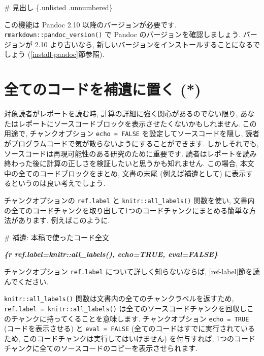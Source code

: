 \documentclass[
  11pt,
]{bxjsreport}
\newenvironment{Shaded}{\begin{snugshade}}{\end{snugshade}}
\newcommand{\FunctionTok}[1]{\textcolor[rgb]{0.00,0.00,0.00}{#1}}
\newcommand{\InformationTok}[1]{\textcolor[rgb]{0.56,0.35,0.01}{\textbf{\textit{#1}}}}
\begin{document}
\begin{Shaded}
\begin{Highlighting}[]
\FunctionTok{\# 見出し \{.unlisted .unnumbered\}}
\end{Highlighting}
\end{Shaded}

この機能は Pandoc 2.10 以降のバージョンが必要です. \texttt{rmarkdown::pandoc\_version()} で Pandoc のバージョンを確認しましょう. バージョンが 2.10 より古いなら, 新しいバージョンをインストールすることになるでしょう (\ref{install-pandoc}節参照).

\hypertarget{code-appendix}{%
\section{全てのコードを補遺に置く (*)}\label{code-appendix}}

対象読者がレポートを読む時, 計算の詳細に強く関心があるのでない限り, あなたはレポートにソースコードブロックを表示させたくないかもしれません. この用途で, チャンクオプション \texttt{echo = FALSE} を設定してソースコードを隠し, 読者がプログラムコードで気が散らないようにすることができます. しかしそれでも, ソースコードは再現可能性のある研究のために重要です. 読者はレポートを読み終わった後に計算の正しさを検証したいと思うかも知れません. この場合, 本文中の全てのコードブロックをまとめ, 文書の末尾 (例えば補遺として) に表示するというのは良い考えでしょう.

チャンクオプションの \texttt{ref.label} と \texttt{knitr::all\_labels()} 関数を使い, 文書内の全てのコードチャンクを取り出して1つのコードチャンクにまとめる簡単な方法があります. 例えばこのように.

\begin{Shaded}
\begin{Highlighting}[]
\FunctionTok{\# 補遺: 本稿で使ったコード全文}

\InformationTok{\textasciigrave{}\textasciigrave{}\textasciigrave{}\{r ref.label=knitr::all\_labels(), echo=TRUE, eval=FALSE\}}
\InformationTok{\textasciigrave{}\textasciigrave{}\textasciigrave{}}
\end{Highlighting}
\end{Shaded}

チャンクオプション \texttt{ref.label} について詳しく知らないならば, \ref{ref-label}節を読んでください.

\texttt{knitr::all\_labels()} 関数は文書内の全てのチャンクラベルを返すため, \texttt{ref.label = knitr::all\_labels()} は全てのソースコードチャンクを回収しこのチャンクに持ってくることを意味します. チャンクオプション \texttt{echo = TRUE} (コードを表示させる) と \texttt{eval = FALSE} (全てのコードはすでに実行されているため, このコードチャンクは実行してはいけません) を付与すれば, 1つのコードチャンクに全てのソースコードのコピーを表示させられます.
\end{document}
